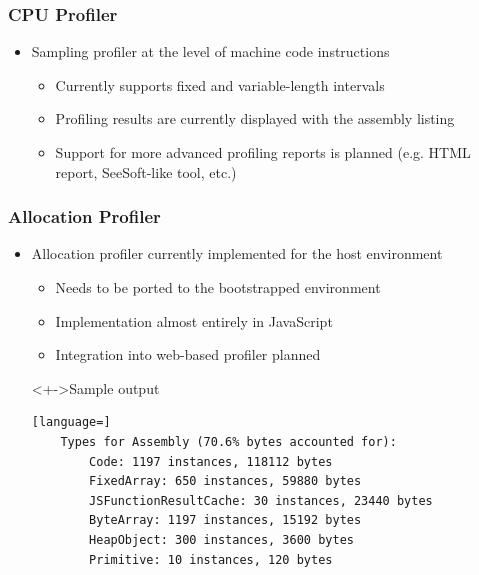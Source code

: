 \begin{frame}
\frametitle{\bf CPU Profiler}

    \begin{itemize}
        \item Sampling profiler at the level of machine code instructions
        \begin{itemize}
            \item Currently supports fixed and variable-length intervals
            \item Profiling results are currently displayed with the assembly listing
            \item Support for more advanced profiling reports is planned (e.g. HTML report, SeeSoft-like tool, etc.)
        \end{itemize}
    \end{itemize}

\end{frame}

\begin{frame}[fragile]
\frametitle{\bf Allocation Profiler}

\begin{itemize}
    \item Allocation profiler currently implemented for the host environment
    \begin{itemize}
        \item Needs to be ported to the bootstrapped environment
        \item Implementation almost entirely in JavaScript
        \item Integration into web-based profiler planned
    \end{itemize}
    \begin{block}<+->{Sample output}
    \begin{lstlisting}[language=]
    Types for Assembly (70.6% bytes accounted for):
        Code: 1197 instances, 118112 bytes
        FixedArray: 650 instances, 59880 bytes
        JSFunctionResultCache: 30 instances, 23440 bytes
        ByteArray: 1197 instances, 15192 bytes
        HeapObject: 300 instances, 3600 bytes
        Primitive: 10 instances, 120 bytes
    \end{lstlisting}
    \end{block}
\end{itemize}
\end{frame}

